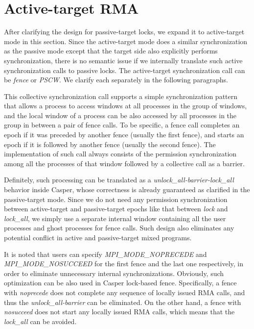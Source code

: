 \section{Active-target RMA}\label{sec:active}
After clarifying the design for passive-target locks, we
expand it to active-target mode in this section. Since the active-target mode does a
similar synchronization as the passive mode except that the target
side also explicitly performs synchronization, there is no semantic
issue if we internally translate such active synchronization calls
to passive locks. The active-target synchronization call can be
\textit{fence} or \textit{PSCW}. We clarify each separately in
the following paragraphs.

 This collective synchronization call supports
a simple synchronization pattern that allows a process to access
windows at all processes in the group of windows, and the local window
of a process can be also accessed by all processes in the group
in between a pair of fence calls. To be specific, a fence call completes
an epoch if it was preceded by another fence (usually the first
fence), and starts an epoch if it is followed by another fence
(usually the second fence). The implementation of such call always
consists of the permission synchronization among all the processes
of that window followed by a collective call as a barrier.

Definitely, such processing can be translated as a
\textit{unlock\_all-barrier-lock\_all} behavior inside Casper,
whose correctness is already guaranteed as clarified in the passive-target
mode. Since we do not need any permission synchronization between
active-target and passive-target epochs like that between \textit{lock}
and \textit{lock\_all}, we simply use a separate internal window
containing all the user processes and ghost processes for fence
calls. Such design also eliminates any potential conflict in active
and passive-target mixed programs.

It is noted that users can specify \textit{MPI\_MODE\_NOPRECEDE} and
\textit{MPI\_MODE\_NOSUCCEED} for the first fence and the last one
respectively, in order to eliminate unnecessary internal
synchronizations. Obviously, such optimization can be also used in
Casper lock-based fence. Specifically, a fence with
\textit{noprecede} does not complete any sequence of locally issued
RMA calls, and thus the \textit{unlock\_all-barrier} can be
eliminated. On the other hand, a fence with \textit{nosucceed} does not start any
locally issued RMA calls, which means that the \textit{lock\_all}
can be avoided.

